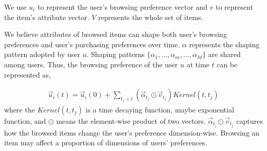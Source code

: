 \documentclass[11pt]{article}
\begin{document}


We use $u_i$ to represent the user's browsing preference vector and $v$ to represent the item's attribute vector. $V$ represents the whole set of items.  

We believe attributes of browsed items can shape both user's browsing preferences and user's purchasing preferences over time. $\alpha$ represents the shaping pattern adopted by user $u$. Shaping patterns $\{\alpha_1, ..., \alpha_m, ..., \alpha_M\}$ are shared among users. Thus, the browsing preference of the user $u$ at time $t$ can be represented as, 

\begin{align}
\label{user_preference_vec}
\vec{u}_i(t) = \vec{u}_i(0)+\sum_{t_j<t} (\vec{\alpha}_{t_j}\odot\vec{v}_{t_j}) Kernel(t,t_j)
\end{align}
where the $Kernel(t, t_j)$ is a time decaying function, maybe exponential function, and $\odot$ means the element-wise product of two vectors. ${\vec{\alpha}}_{t_j}\odot\vec{v}_{t_j}$ captures how the browsed items change the user's preference dimension-wise. Browsing an item may affect a proportion of dimensions of users' preferences.  
\end{document}
